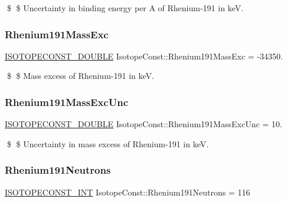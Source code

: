 \$ \$ Uncertainty in binding energy per A of Rhenium-\/191 in keV. \mbox{\label{group___isotope_const-_rhenium-_re191_ga464ba770c68141f3f85f8629aa4b84ef}} 
\subsubsection{\texorpdfstring{Rhenium191\+Mass\+Exc}{Rhenium191MassExc}}
{\footnotesize\ttfamily \mbox{\hyperlink{group___isotope_const-_macros_ga8f45a7272ce02c0b4c65c44636ed719a}{I\+S\+O\+T\+O\+P\+E\+C\+O\+N\+S\+T\+\_\+\+D\+O\+U\+B\+LE}} Isotope\+Const\+::\+Rhenium191\+Mass\+Exc = -\/34350.}

\$ \$ Mass excess of Rhenium-\/191 in keV. \mbox{\label{group___isotope_const-_rhenium-_re191_gaa02f557d9f30b53cd40fe7a7a6b68f02}} 
\subsubsection{\texorpdfstring{Rhenium191\+Mass\+Exc\+Unc}{Rhenium191MassExcUnc}}
{\footnotesize\ttfamily \mbox{\hyperlink{group___isotope_const-_macros_ga8f45a7272ce02c0b4c65c44636ed719a}{I\+S\+O\+T\+O\+P\+E\+C\+O\+N\+S\+T\+\_\+\+D\+O\+U\+B\+LE}} Isotope\+Const\+::\+Rhenium191\+Mass\+Exc\+Unc = 10.}

\$ \$ Uncertainty in mass excess of Rhenium-\/191 in keV. \mbox{\label{group___isotope_const-_rhenium-_re191_gae3202aeb40deb4e49df34d4b410896f3}} 
\subsubsection{\texorpdfstring{Rhenium191\+Neutrons}{Rhenium191Neutrons}}
{\footnotesize\ttfamily \mbox{\hyperlink{group___isotope_const-_macros_ga5f18360b3e99483a35c32d789e62621c}{I\+S\+O\+T\+O\+P\+E\+C\+O\+N\+S\+T\+\_\+\+I\+NT}} Isotope\+Const\+::\+Rhenium191\+Neutrons = 116}


